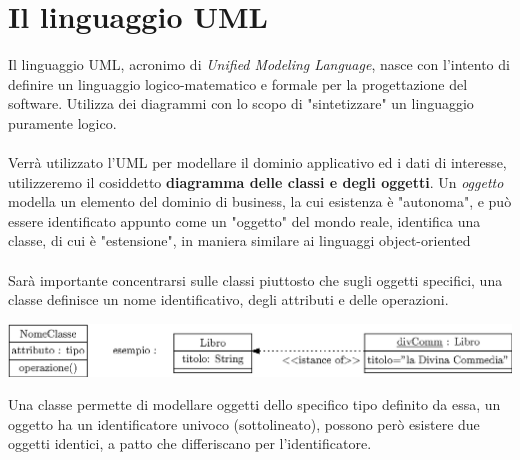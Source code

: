 \documentclass[12pt, letterpaper]{article}
\newcommand{\acc}{\\\hphantom{}\\}
\begin{document}
\section{Il linguaggio UML}
Il linguaggio UML, acronimo di \textit{Unified Modeling Language}, nasce con l'intento di definire un
linguaggio logico-matematico e formale per la progettazione del software. Utilizza dei diagrammi con lo scopo di
"sintetizzare" un linguaggio puramente logico. \acc
Verrà utilizzato l'UML per modellare il dominio applicativo ed i dati di interesse, utilizzeremo il cosiddetto
\textbf{diagramma delle classi e degli oggetti}. Un \textit{oggetto} modella un elemento del dominio di business,
la cui esistenza è "autonoma", e può essere identificato appunto come un "oggetto" del mondo reale, identifica una classe,
di cui è "estensione", in maniera similare ai linguaggi object-oriented\acc Sarà importante concentrarsi sulle classi
piuttosto che sugli oggetti specifici, una classe definisce un nome identificativo, degli attributi e delle
operazioni.\begin{center}
    \includegraphics[width=\textwidth ]{images/umlBase.eps}
\end{center}
Una classe permette di modellare oggetti dello specifico tipo definito da essa, un oggetto ha un identificatore
univoco (sottolineato), possono però esistere due oggetti identici, a patto che differiscano per
l'identificatore.
\end{document}
